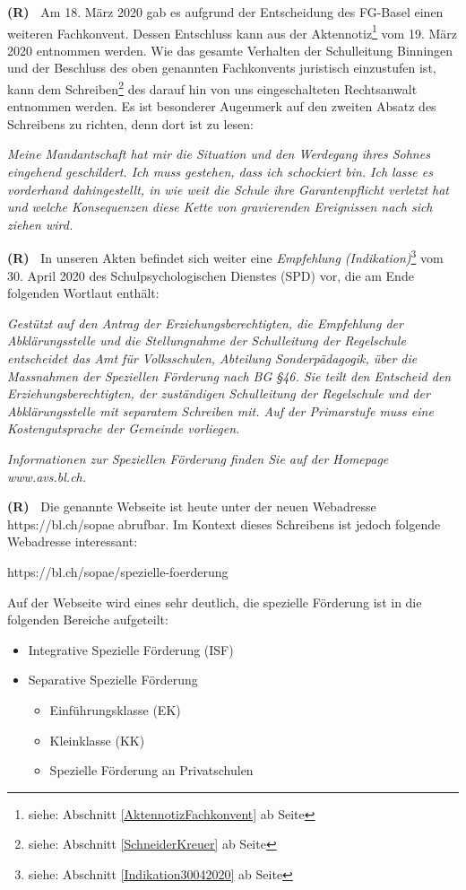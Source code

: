 \documentclass[paper=a4,fontsize=12pt, oneside, numbers=noenddot]{scrbook}
\newcounter{rz}
\newcommand{\Rz}{
	\addtocounter{rz}{1}\textbf{(R\arabic{rz})~}
}
\newcommand{\footnoteExt}[1]{\footnote{siehe: Abschnitt \ref{#1} ab Seite \pageref{#1}}}
\begin{document}
\Rz Am 18. März 2020 gab es aufgrund der Entscheidung des FG-Basel einen weiteren Fachkonvent. Dessen Entschluss kann aus der Aktennotiz\footnoteExt{AktennotizFachkonvent} vom 19. März 2020 entnommen werden. Wie das gesamte Verhalten der Schulleitung Binningen und der Beschluss des oben genannten Fachkonvents juristisch einzustufen ist, kann dem Schreiben\footnoteExt{SchneiderKreuer} des darauf hin von uns eingeschalteten Rechtsanwalt entnommen werden. Es ist besonderer Augenmerk auf den zweiten Absatz des Schreibens zu richten, denn dort ist zu lesen:
\begin{addmargin}[2.5em]{0em}\emph{Meine Mandantschaft hat mir die Situation und den Werdegang ihres Sohnes eingehend geschildert. Ich muss gestehen, dass ich schockiert bin. Ich lasse es vorderhand dahingestellt, in wie weit die Schule ihre Garantenpflicht verletzt hat und welche Konsequenzen diese Kette von gravierenden Ereignissen nach sich ziehen wird.}
\end{addmargin}

\Rz In unseren Akten befindet sich weiter eine \textit{Empfehlung (Indikation)}\footnoteExt{Indikation30042020} vom 30. April 2020 des Schulpsychologischen Dienstes (SPD) vor, die am Ende folgenden Wortlaut enthält:

\begin{addmargin}[2.5em]{0em}\emph{Gestützt auf den Antrag der Erziehungsberechtigten, die Empfehlung der Abklärungsstelle und die Stellungnahme der Schulleitung der Regelschule entscheidet das Amt für Volksschulen, Abteilung Sonderpädagogik, über die Massnahmen der Speziellen Förderung nach BG §46. Sie teilt den Entscheid den Erziehungsberechtigten, der zuständigen Schulleitung der Regelschule und der Abklärungsstelle mit separatem Schreiben mit. Auf der Primarstufe muss eine Kostengutsprache der Gemeinde vorliegen.}
	
\emph{Informationen zur Speziellen Förderung finden Sie auf der Homepage www.avs.bl.ch.}
\end{addmargin}

\Rz Die genannte Webseite ist heute unter der neuen Webadresse https://bl.ch/sopae abrufbar. Im Kontext dieses Schreibens ist jedoch folgende Webadresse interessant:

https://bl.ch/sopae/spezielle-foerderung

Auf der Webseite wird eines sehr deutlich, die spezielle Förderung ist in die folgenden Bereiche aufgeteilt:

\begin{itemize}[noitemsep]\setlength\itemsep{0.3em}
	\item Integrative Spezielle Förderung (ISF)
	\item Separative Spezielle Förderung
	\begin{itemize}[noitemsep]\setlength\itemsep{0.3em}
		\item Einführungsklasse (EK)
		\item Kleinklasse (KK)
		\item Spezielle Förderung an Privatschulen
	\end{itemize} 
\end{itemize} 
\end{document}
